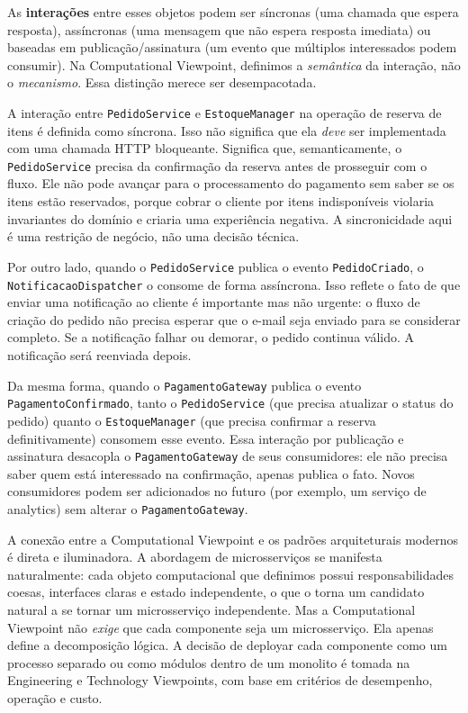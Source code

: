 As \textbf{interações} entre esses objetos podem ser síncronas (uma chamada que
espera resposta), assíncronas (uma mensagem que não espera resposta imediata) ou
baseadas em publicação/assinatura (um evento que múltiplos interessados podem
consumir). Na Computational Viewpoint, definimos a \emph{semântica} da interação,
não o \emph{mecanismo}. Essa distinção merece ser desempacotada.

A interação entre \texttt{PedidoService} e \texttt{EstoqueManager} na operação de
reserva de itens é definida como síncrona. Isso não significa que ela \emph{deve}
ser implementada com uma chamada HTTP bloqueante. Significa que, semanticamente,
o \texttt{PedidoService} precisa da confirmação da reserva antes de prosseguir com
o fluxo. Ele não pode avançar para o processamento do pagamento sem saber se os
itens estão reservados, porque cobrar o cliente por itens indisponíveis violaria
invariantes do domínio e criaria uma experiência negativa. A sincronicidade aqui é
uma restrição de negócio, não uma decisão técnica.

Por outro lado, quando o \texttt{PedidoService} publica o evento
\texttt{PedidoCriado}, o \texttt{NotificacaoDispatcher} o consome de forma
assíncrona. Isso reflete o fato de que enviar uma notificação ao cliente é
importante mas não urgente: o fluxo de criação do pedido não precisa esperar que
o e-mail seja enviado para se considerar completo. Se a notificação falhar ou
demorar, o pedido continua válido. A notificação será reenviada depois.

Da mesma forma, quando o \texttt{PagamentoGateway} publica o evento
\texttt{PagamentoConfirmado}, tanto o \texttt{PedidoService} (que precisa atualizar
o status do pedido) quanto o \texttt{EstoqueManager} (que precisa confirmar a
reserva definitivamente) consomem esse evento. Essa interação por publicação e
assinatura desacopla o \texttt{PagamentoGateway} de seus consumidores: ele não
precisa saber quem está interessado na confirmação, apenas publica o fato. Novos
consumidores podem ser adicionados no futuro (por exemplo, um serviço de analytics)
sem alterar o \texttt{PagamentoGateway}.

A conexão entre a Computational Viewpoint e os padrões arquiteturais modernos é
direta e iluminadora. A abordagem de microsserviços se manifesta naturalmente: cada
objeto computacional que definimos possui responsabilidades coesas, interfaces
claras e estado independente, o que o torna um candidato natural a se tornar um
microsserviço independente. Mas a Computational Viewpoint não \emph{exige} que cada
componente seja um microsserviço. Ela apenas define a decomposição lógica. A
decisão de deployar cada componente como um processo separado ou como módulos
dentro de um monolito é tomada na Engineering e Technology Viewpoints, com base em
critérios de desempenho, operação e custo.

